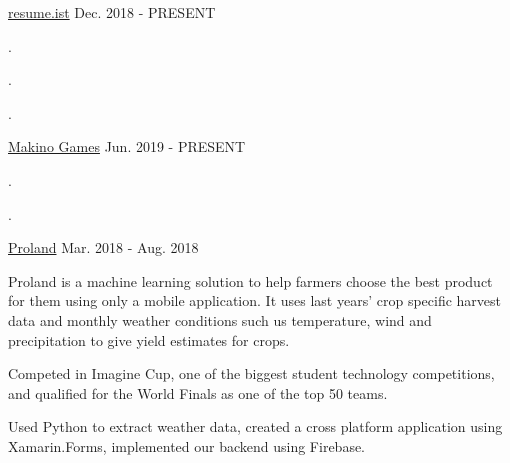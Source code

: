 
\vspace*{-1.5mm}
\begin{cventries}


  \project
  {\href{https://resume.ist}{resume.ist}} %
  {Dec. 2018 - PRESENT} %
  {
    \begin{cvitems}
      \item {.}
      \item {.}
      \item {.}
    \end{cvitems}
  }

  \project
  {\href{https://makino.games}{Makino Games}} %
  {Jun. 2019 - PRESENT} %
  {
    \begin{cvitems}
      \item {.}
      \item {.}
    \end{cvitems}
  }



  \project
    {\href{http://prolandfarming.com}{Proland}} %
    {Mar. 2018 - Aug. 2018} %
    {
      \begin{cvitems}
        \item {Proland is a machine learning solution to help farmers choose the best product for them using only a mobile application. It uses last years' crop specific harvest data and monthly weather conditions such us temperature, wind and precipitation to give yield estimates for crops.}
        \item {Competed in Imagine Cup, one of the biggest student technology competitions, and qualified for the World Finals as one of the top 50 teams.}
        \item {Used Python to extract weather data, created a cross platform application using Xamarin.Forms, implemented our backend using Firebase.}
      \end{cvitems}
    }
\end{cventries}
